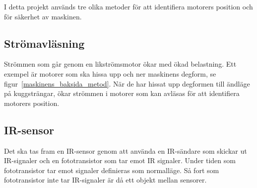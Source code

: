 I detta projekt används tre olika metoder för att identifiera motorers position och för säkerhet av maskinen.
\subsection{Strömavläsning}
Strömmen som går genom en likströmsmotor ökar med ökad belastning. Ett exempel är motorer som ska hissa upp och ner maskinens degform, se figur~\ref{maskinens_baksida_metod}. När de har hissat upp degformen till ändläge på kuggsträngar, ökar strömmen i motorer som kan avläsas för att identifiera motorers position.
\subsection{IR-sensor}
Det ska tas fram en IR-sensor genom att använda en IR-sändare som skickar ut IR-signaler och en fototransistor som tar emot IR signaler. Under tiden som fototransistor tar emot signaler definieras som normalläge. Så fort som fototransistor inte tar IR-signaler är då ett objekt mellan sensorer.

